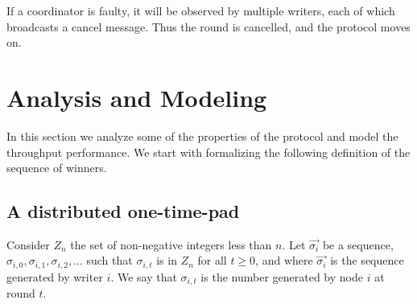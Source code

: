 \documentclass[10pt]{article}
\begin{document}
If a coordinator is faulty, it will be observed by multiple writers, each of which broadcasts a cancel message. Thus the round is cancelled, and the protocol moves on.


\section{Analysis and Modeling}
In this section we analyze some of the properties of the protocol and model the throughput performance. We start with formalizing the following definition of the sequence of winners.








\subsection{A distributed one-time-pad}
Consider $Z_n$ the set of non-negative integers less than $n$. 
Let $\vec{\sigma_i}$ be a sequence, $\sigma_{i,0}, \sigma_{i,1}, \sigma_{i,2}, ...$ such that $\sigma_{i,t}$ is in $Z_n$ for all $t \ge 0$, and where $\vec{\sigma_i}$ is the sequence generated by writer $i$. We say that $\sigma_{i,t}$ is the number generated by node $i$ at round $t$.
\end{document}
